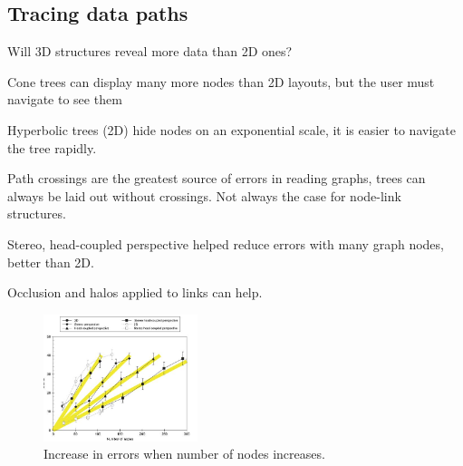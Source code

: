 \begin{mdframed}
\subsection{Tracing data paths}
\begin{multicols}{2}
\begin{compactdesc}
\item[Will 3D structures] reveal more data than 2D ones?
\item[Cone trees] can display many more nodes than 2D layouts, but the user
    must navigate to see them
\item[Hyperbolic trees (2D)] hide nodes on an exponential scale, it is easier to
    navigate the tree rapidly.
\item[Path crossings] are the greatest source of errors in reading graphs,
    trees can always be laid out without crossings. Not always the case for
    node-link structures.
\item[Stereo, head-coupled] perspective helped reduce errors with many graph
    nodes, better than 2D.
\item[Occlusion and halos] applied to links can help.
\end{compactdesc}

    \begin{figure}[H]
        \centering
        \includegraphics[width=0.4\textwidth]{node_vis_experiment.png}
        \caption{Increase in errors when number of nodes increases.}
    \end{figure}
\end{multicols}\end{mdframed}



